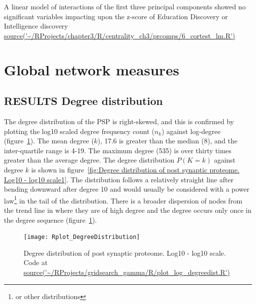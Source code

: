 A linear model of interactions of the first three principal components showed no significant variables impacting upon the  z-score of Education Discovery or Intelligence discovery \url{source('~/RProjects/chapter3/R/centrality_ch3/prcomps/6_cortest_lm.R')}

\clearpage
\section{Global network measures}




\subsection{RESULTS Degree distribution}
\label{sec:results degree distribution}
The degree distribution of the PSP is right-skewed, and this is confirmed by plotting the log10 scaled degree frequency count ($n_k$) against log-degree (figure~\ref{fig:Degree distribution of post synaptic proteome. Log10 - log10 scale.}).
The mean degree ($k$), 17.6 is greater than the median (8), and the inter-quartile range is 4-19.  The maximum degree (535) is over thirty times greater than the average degree.  The degree distribution $P(K=k)$ against degree $k$ is shown in figure~\ref{fig:Degree distribution of post synaptic proteome. Log10 - log10 scale1}. The distribution follows a relatively straight line after bending downward after degree 10 and would usually be considered with a power law\footnote{or other distributions} in the tail of the distribution. There is a broader dispersion of nodes from the trend line in where they are of high degree and the degree occurs only once in the degree sequence (figure~\ref{fig:Degree distribution of post synaptic proteome. Log10 - log10 scale.}).

\begin{figure}
    \texttt{[image: Rplot\_DegreeDistribution]}
    \caption{Degree distribution of post synaptic proteome. Log10 - log10 scale. Code at \url{source('~/RProjects/gridsearch_gamma/R/plot_log_degreedist.R') }}
    \label{fig:Degree distribution of post synaptic proteome. Log10 - log10 scale.}
\end{figure}

